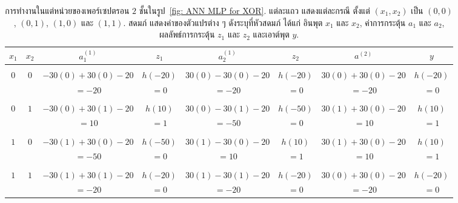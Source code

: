 %
\begin{table}[hbtp]
	\caption[ตัวอย่างการทำงานของเพอร์เซปตรอน]{การทำงานในแต่หน่วยของเพอร์เซปตรอน $2$ ชั้นในรูป~\ref{fig: ANN MLP for XOR}.
	แต่ละแถว แสดงแต่ละกรณี ตั้งแต่ $(x_1, x_2)$ เป็น $(0,0)$, $(0,1)$, $(1,0)$ และ $(1,1)$.
	สดมภ์ แสดงค่าของตัวแปรต่าง ๆ ดังระบุที่หัวสดมภ์ ได้แก่ อินพุต $x_1$ และ $x_2$,
ค่าการกระตุ้น $a_1$ และ $a_2$, ผลลัพธ์การกระตุ้น $z_1$ และ $z_2$ และเอาต์พุต $y$.	
}
	{\footnotesize	
		\begin{center}
			\begin{tabular}{|c|c|c|c|c|c|c|c|}
				\hline 
				$x_1$ & $x_2$ 
				& $a^{(1)}_1$ & $z_1$ 
				& $a^{(1)}_2$ & $z_2$ 
				& $a^{(2)}$ & $y$ \\
				\hline
				& & & & & & & \\
				$0$     &    $0$  
				& $-30 (0) + 30 (0) - 20$   & $h(-20)$
				& $30 (0) - 30 (0) - 20$   & $h(-20)$
				& $30 (0) + 30 (0) - 20$  & $h(-20)$ \\
				& 
				& $= -20$ & $= 0$
				& $= -20$ & $= 0$
				& $= -20$ &  $= 0$ \\
				\hline
				& & & & & & & \\
				$0$     &    $1$  
				& $-30 (0) + 30 (1) - 20$   & $h(10)$
				& $30 (0) - 30 (1) - 20$   & $h(-50)$
				& $30 (1) + 30 (0) - 20$  & $h(10)$ \\
				& 
				& $= 10$ & $= 1$
				& $= -50$ & $= 0$
				& $= 10$ &  $= 1$ \\
				\hline
				& & & & & & & \\				
				$1$     &    $0$  
				& $-30 (1) + 30 (0) - 20$   & $h(-50)$
				& $30 (1) - 30 (0) - 20$   & $h(10)$
				& $30 (1) + 30 (0) - 20$  & $h(10)$ \\
				& 
				& $= -50$ & $= 0$
				& $= 10$ & $= 1$
				& $= 10$ &  $= 1$ \\
				\hline
				& & & & & & & \\
				$1$     &    $1$  
				& $-30 (1) + 30 (1) - 20$   & $h(-20)$
				& $30 (1) - 30 (1) - 20$   & $h(-20)$
				& $30 (0) + 30 (0) - 20$  & $h(-20)$ \\
				& 
				& $= -20$ & $= 0$
				& $= -20$ & $= 0$
				& $= -20$ &  $= 0$ \\
				\hline
			\end{tabular} 
		\end{center}
	}%
	\label{tbl: ANN MLP for XOR}
\end{table}





